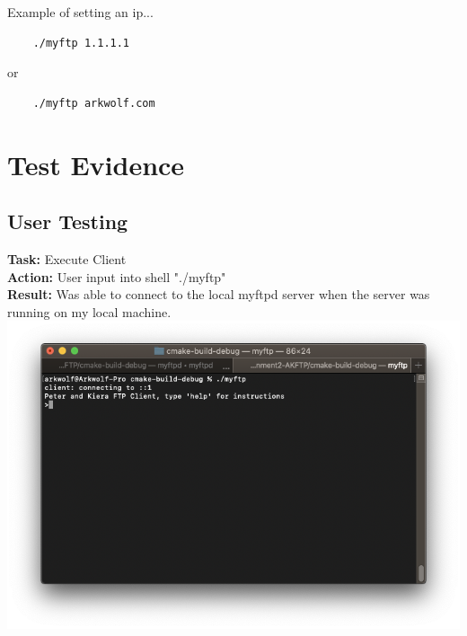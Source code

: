 \documentclass{article}
\begin{document}
Example of setting an ip...
\begin{lstlisting}
    ./myftp 1.1.1.1
\end{lstlisting}
or
\begin{lstlisting}
    ./myftp arkwolf.com
\end{lstlisting}


\section{Test Evidence}
\subsection{User Testing}
%

\textbf{Task:} Execute Client\\
\textbf{Action:} User input into shell "./myftp"\\
\textbf{Result:} Was able to connect to the local myftpd server when the server was running on my local machine.\\
\includegraphics[width=\textwidth]{testpictures/connect}
\end{document}
